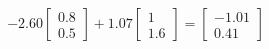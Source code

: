 \documentclass[preview]{standalone}
\begin{document}
\begin{align*}
-2.60 \begin{bmatrix} 0.8 \\ 0.5 \end{bmatrix} + 1.07 \begin{bmatrix} 1 \\ 1.6 \end{bmatrix} = \begin{bmatrix} -1.01 \\ 0.41 \end{bmatrix}
\end{align*}
\end{document}
